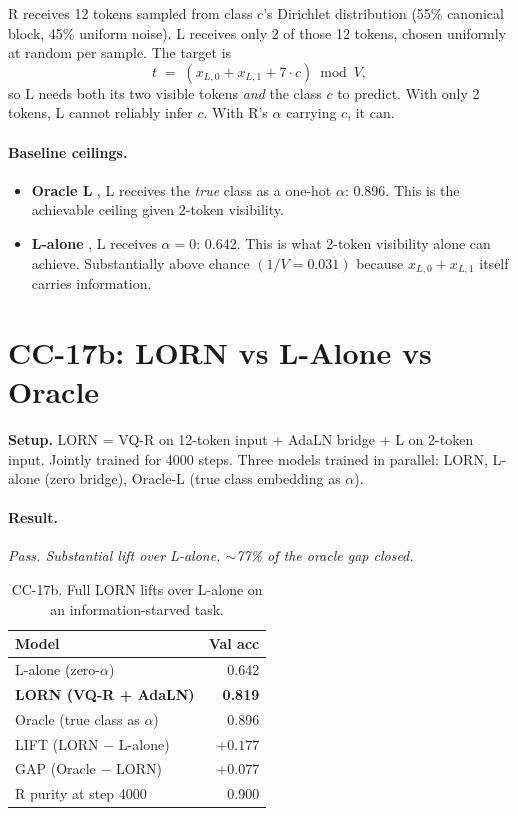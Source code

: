 \documentclass[10pt, twocolumn, a4paper]{article}
\begin{document}
R receives 12 tokens sampled from class $c$'s Dirichlet distribution (55\% canonical block, 45\% uniform noise). L receives only 2 of those 12 tokens, chosen uniformly at random per sample. The target is
\[
t \;=\; (x_{L,0} + x_{L,1} + 7 \cdot c) \bmod V,
\]
so L needs both its two visible tokens \emph{and} the class $c$ to predict. With only 2 tokens, L cannot reliably infer $c$. With R's $\alpha$ carrying $c$, it can.

\paragraph{Baseline ceilings.}
\begin{itemize}[nosep]
\item \textbf{Oracle L} ,  L receives the \emph{true} class as a one-hot $\alpha$: 0.896. This is the achievable ceiling given 2-token visibility.
\item \textbf{L-alone} ,  L receives $\alpha = 0$: 0.642. This is what 2-token visibility alone can achieve. Substantially above chance $(1/V = 0.031)$ because $x_{L,0} + x_{L,1}$ itself carries information.
\end{itemize}

\section{CC-17b: LORN vs L-Alone vs Oracle}

\textbf{Setup.} LORN = VQ-R on 12-token input + AdaLN bridge + L on 2-token input. Jointly trained for 4000 steps. Three models trained in parallel: LORN, L-alone (zero bridge), Oracle-L (true class embedding as $\alpha$).

\paragraph{Result.} \emph{Pass. Substantial lift over L-alone, $\sim$77\% of the oracle gap closed.}

\begin{table}[t]
\centering\small
\caption{CC-17b. Full LORN lifts over L-alone on an information-starved task.}
\label{tab:cc17b}
\begin{tabular}{lr}
\toprule
Model & Val acc \\
\midrule
L-alone (zero-$\alpha$) & 0.642 \\
\textbf{LORN (VQ-R + AdaLN)} & \textbf{0.819} \\
Oracle (true class as $\alpha$) & 0.896 \\
\midrule
LIFT (LORN $-$ L-alone) & $+0.177$ \\
GAP (Oracle $-$ LORN) & $+0.077$ \\
R purity at step 4000 & 0.900 \\
\bottomrule
\end{tabular}
\end{table}
\end{document}
